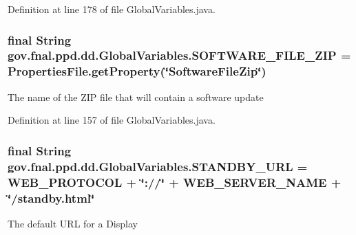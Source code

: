 Definition at line 178 of file Global\-Variables.\-java.

\hypertarget{classgov_1_1fnal_1_1ppd_1_1dd_1_1GlobalVariables_ab8e56e6480b2c30248d2e20aee782cb4}{
\subsubsection[{S\-O\-F\-T\-W\-A\-R\-E\-\_\-\-F\-I\-L\-E\-\_\-\-Z\-I\-P}]{\setlength{\rightskip}{0pt plus 5cm}final String gov.\-fnal.\-ppd.\-dd.\-Global\-Variables.\-S\-O\-F\-T\-W\-A\-R\-E\-\_\-\-F\-I\-L\-E\-\_\-\-Z\-I\-P = {\bf Properties\-File.\-get\-Property}(\char`\"{}Software\-File\-Zip\char`\"{})\hspace{0.3cm}{\ttfamily [static]}}}\label{classgov_1_1fnal_1_1ppd_1_1dd_1_1GlobalVariables_ab8e56e6480b2c30248d2e20aee782cb4}
The name of the Z\-I\-P file that will contain a software update 

Definition at line 157 of file Global\-Variables.\-java.

\hypertarget{classgov_1_1fnal_1_1ppd_1_1dd_1_1GlobalVariables_a7519a50604167fa9cf1c9e51cd4a6267}{
\subsubsection[{S\-T\-A\-N\-D\-B\-Y\-\_\-\-U\-R\-L}]{\setlength{\rightskip}{0pt plus 5cm}final String gov.\-fnal.\-ppd.\-dd.\-Global\-Variables.\-S\-T\-A\-N\-D\-B\-Y\-\_\-\-U\-R\-L = {\bf W\-E\-B\-\_\-\-P\-R\-O\-T\-O\-C\-O\-L} + \char`\"{}\-://\char`\"{} + {\bf W\-E\-B\-\_\-\-S\-E\-R\-V\-E\-R\-\_\-\-N\-A\-M\-E} + \char`\"{}/standby.\-html\char`\"{}\hspace{0.3cm}{\ttfamily [static]}}}\label{classgov_1_1fnal_1_1ppd_1_1dd_1_1GlobalVariables_a7519a50604167fa9cf1c9e51cd4a6267}
The default U\-R\-L for a Display 

